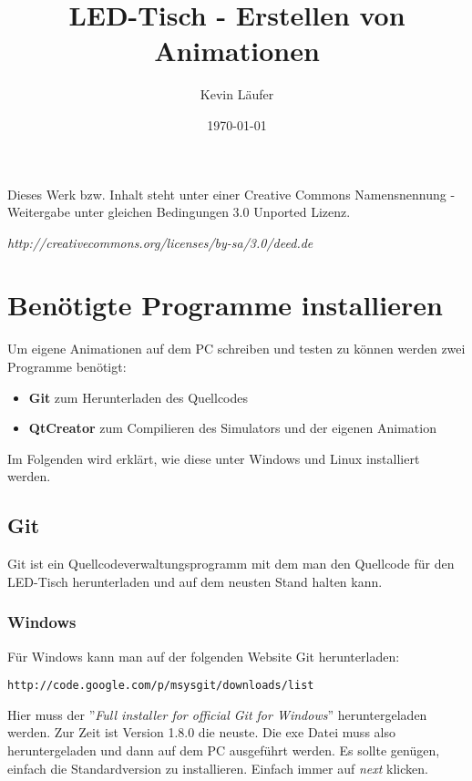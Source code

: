 \documentclass[10pt,a4paper]{article}
\begin{document}
\begin{titlepage}
\author{Kevin Läufer}
\title{LED-Tisch - Erstellen von Animationen}
\date{\today}
\end{titlepage}

\maketitle

Dieses Werk bzw. Inhalt steht unter einer Creative Commons Namensnennung - Weitergabe unter gleichen Bedingungen 3.0 Unported Lizenz.

\textit{http://creativecommons.org/licenses/by-sa/3.0/deed.de}


\tableofcontents

\section{Benötigte Programme installieren}
Um eigene Animationen auf dem PC schreiben und testen zu können werden zwei Programme benötigt:
\begin{itemize}
	\item \textbf{Git} zum Herunterladen des Quellcodes
	\item \textbf{QtCreator} zum Compilieren des Simulators und der eigenen Animation
\end{itemize}
Im Folgenden wird erklärt, wie diese unter Windows und Linux installiert werden.

\subsection{Git}
Git ist ein Quellcodeverwaltungsprogramm mit dem man den Quellcode für den LED-Tisch herunterladen und auf dem neusten Stand halten kann.

\subsubsection{Windows}
Für Windows kann man auf der folgenden Website Git herunterladen:
\begin{lstlisting}
http://code.google.com/p/msysgit/downloads/list
\end{lstlisting}
Hier muss der ''\textit{Full installer for official Git for Windows}'' heruntergeladen werden. Zur Zeit ist Version 1.8.0 die neuste.
Die exe Datei muss also heruntergeladen und dann auf dem PC ausgeführt werden. Es sollte genügen, einfach die Standardversion zu installieren. Einfach immer auf \textit{next} klicken.
\end{document}
